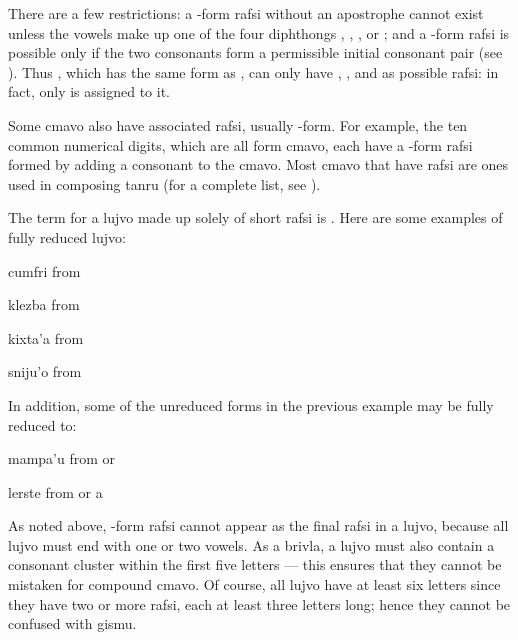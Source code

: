 There are a few restrictions: a -form rafsi without an apostrophe cannot exist unless the vowels make up one of the four diphthongs , , , or ; and a -form rafsi is possible only if the two consonants form a permissible initial consonant pair (see ). Thus , which has the same form as , can only have , , and  as possible rafsi: in fact, only  is assigned to it.

Some cmavo also have associated rafsi, usually -form. For example, the ten common numerical digits, which are all  form cmavo, each have a -form rafsi formed by adding a consonant to the cmavo. Most cmavo that have rafsi are ones used in composing tanru (for a complete list, see ).

The term for a lujvo made up solely of short rafsi is . Here are some examples of fully reduced lujvo:
\begin{example}
cumfri\n
from \n
{}
\end{example}

\begin{example}
klezba\n
from \n
{}
\end{example}

\begin{example}
kixta'a\n
from \n
{}
\end{example}

\begin{example}
sniju'o\n
from \n
{}
\end{example}

In addition, some of the unreduced forms in the previous example may be fully reduced to:
\begin{example}
mampa'u\n
from \n
{} or 
\end{example}

\begin{example}
lerste\n
from \n
{} or a 
\end{example}

As noted above, -form rafsi cannot appear as the final rafsi in a lujvo, because all lujvo must end with one or two vowels. As a brivla, a lujvo must also contain a consonant cluster within the first five letters --- this ensures that they cannot be mistaken for compound cmavo. Of course, all lujvo have at least six letters since they have two or more rafsi, each at least three letters long; hence they cannot be confused with gismu. 

